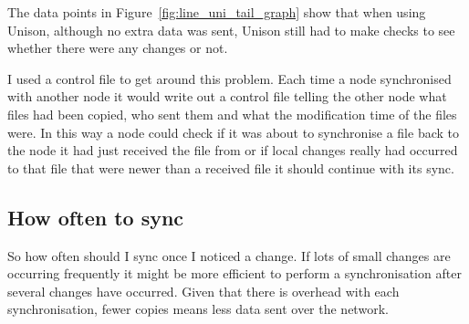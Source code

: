 \documentclass[12pt]{article}
\begin{document}
The data points in Figure~\ref{fig:line_uni_tail_graph} show that when using
Unison, although no extra data was sent, Unison still had to make checks to see
whether there were any changes or not.

I used a control file to get around this problem. Each time a node
synchronised with another node it would write out a control file telling
the other node what files had been copied, who sent them and what the
modification time of the files were. In this way a node could check
if it was about to synchronise a file back to the node it had just received
the file from or if local changes really had occurred to that file
that were newer than a received file it should continue with its sync.

\subsection{How often to sync}
So how often should I sync once I noticed a change.
If lots of small changes are occurring frequently it might be more efficient
to perform a synchronisation after several changes have occurred. Given that
there is overhead with each synchronisation, fewer copies means less data
sent over the network.
\end{document}
